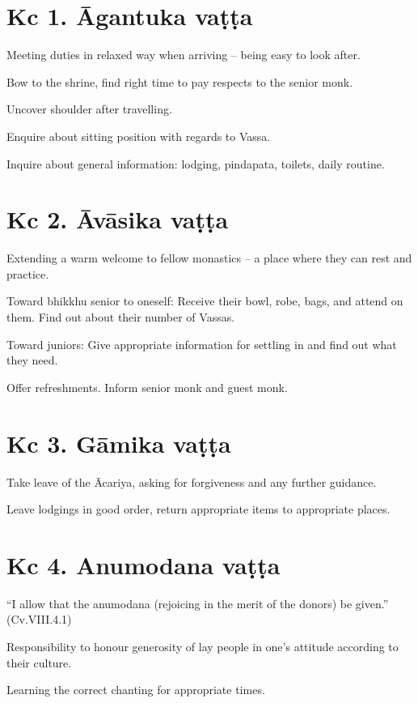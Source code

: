 \section{Kc 1. Āgantuka vaṭṭa}

Meeting duties in relaxed way when arriving -- being easy to look after.

Bow to the shrine, find right time to pay respects to the senior monk.

Uncover shoulder after travelling.

Enquire about sitting position with regards to Vassa.

Inquire about general information: lodging, pindapata, toilets, daily
routine.

\section{Kc 2. Āvāsika vaṭṭa}

Extending a warm welcome to fellow monastics -- a place where they can
rest and practice.

Toward bhikkhu senior to oneself: Receive their bowl, robe, bags, and
attend on them. Find out about their number of Vassas.

Toward juniors: Give appropriate information for settling in and find
out what they need.

Offer refreshments. Inform senior monk and guest monk.

\clearpage

\section{Kc 3. Gāmika vaṭṭa}

Take leave of the Ācariya, asking for forgiveness and any further
guidance.

Leave lodgings in good order, return appropriate items to appropriate
places.

\section{Kc 4. Anumodana vaṭṭa}

``I allow that the anumodana (rejoicing in the merit of the donors) be
given.'' (Cv.VIII.4.1)

Responsibility to honour generosity of lay people in one's attitude
according to their culture.

Learning the correct chanting for appropriate times.

